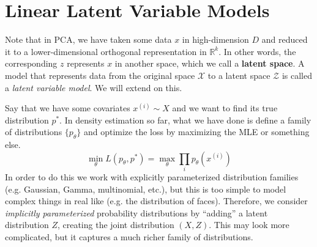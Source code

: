 \documentclass{article}
\begin{document}
\section{Linear Latent Variable Models}

  Note that in PCA, we have taken some data $x$ in high-dimension $D$ and reduced it to a lower-dimensional orthogonal representation in $\mathbb{R}^k$. In other words, the corresponding $z$ represents $x$ in another space, which we call a \textbf{latent space}. A model that represents data from the original space $\mathcal{X}$ to a latent space $\mathcal{Z}$ is called a \textit{latent variable model}. We will extend on this. 

  Say that we have some covariates $x^{(i)} \sim X$ and we want to find its true distribution $p^\ast$. In density estimation so far, what we have done is define a family of distributions $\{p_\theta\}$ and optimize the loss by maximizing the MLE or something else. 
  \begin{equation}
    \min_\theta L(p_\theta, p^\ast) = \max_\theta \prod_{i} p_\theta(x^{(i)})
  \end{equation}
  In order to do this we work with explicitly parameterized distribution families (e.g. Gaussian, Gamma, multinomial, etc.), but this is too simple to model complex things in real like (e.g. the distribution of faces). Therefore, we consider \textit{implicitly parameterized} probability distributions by ``adding'' a latent distribution $Z$, creating the joint distribution $(X, Z)$. This may look more complicated, but it captures a much richer family of distributions. 
\end{document}
